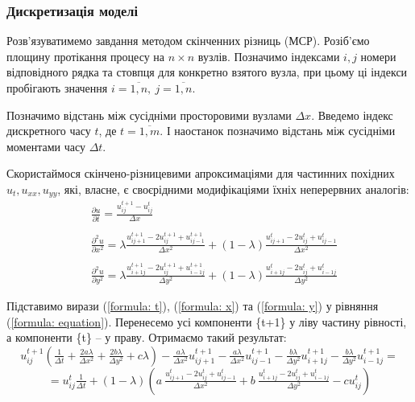 \documentclass[a4paper,14pt]{extarticle} %
\begin{document}
\subsubsection*{Дискретизація моделі} 

Розв'язуватимемо завдання методом скінченних різниць (МСР). Розіб'ємо площину протікання процесу на $n\times n$ 
вузлів. Позначимо індексами $i,j$ номери відповідного рядка та стовпця для конкретно взятого вузла, при цьому 
ці індекси пробігають значення $i=\overline{1,n},\ j=\overline{1,n}$.

Позначимо відстань між сусідніми просторовими вузлами $\Delta x$. Введемо індекс дискретного часу $t$, 
де $t=\overline{1,m}$. І наостанок позначимо відстань між сусідніми моментами часу $\Delta t$.

Скористаймося скінчено-різницевими апроксимаціями для частинних похідних $u_t,u_{xx},u_{yy}$, які, власне, 
є своєрідними модифікаціями їхніх неперервних аналогів:
\begin{align}
    &\frac{\partial u}{\partial t}=\frac{u_{ij}^{t+1} - u_{ij}^{t}}{\Delta x} \label{formula: t} \\ \nonumber \\
    &\frac{\partial^2 u}{\partial x^2}=\lambda\frac{u_{ij+1}^{t+1}-2u_{ij}^{t+1}+u_{ij-1}^{t+1}}{\Delta x^2} 
    + (1-\lambda)\frac{u_{ij+1}^{t}-2u_{ij}^{t}+u_{ij-1}^{t}}{\Delta x^2} \label{formula: x} \\ \nonumber \\
    &\frac{\partial^2 u}{\partial y^2}=\lambda\frac{u_{i+1j}^{t+1}-2u_{ij}^{t+1}+u_{i-1j}^{t+1}}{\Delta y^2} 
    + (1-\lambda)\frac{u_{i+1j}^{t}-2u_{ij}^{t}+u_{i-1j}^{t}}{\Delta y^2} \label{formula: y}
\end{align}

\newpage
Підставимо вирази (\ref{formula: t}), (\ref{formula: x}) та (\ref{formula: y}) у рівняння (\ref{formula: equation}). 
Перенесемо усі компоненти \{t+1\} у ліву частину рівності, а компоненти \{t\} -- у праву. Отримаємо такий 
результат:
\[  u_{ij}^{t+1}(\tfrac{1}{\Delta t}+\tfrac{2a\lambda}{\Delta x^2}+\tfrac{2b\lambda}{\Delta y^2}+c\lambda) - 
    \tfrac{a\lambda}{\Delta x^2}u_{ij+1}^{t+1}-\tfrac{a\lambda}{\Delta x^2}u_{ij-1}^{t+1} - 
    \tfrac{b\lambda}{\Delta y^2}u_{i+1j}^{t+1}-\tfrac{b\lambda}{\Delta y^2}u_{i-1j}^{t+1} = \]
\[  =u_{ij}^t\tfrac{1}{\Delta t} + (1-\lambda)\left(a\ \tfrac{u_{ij+1}^{t}-2u_{ij}^{t}+u_{ij-1}^{t}}{\Delta x^2} + 
    b\ \tfrac{u_{i+1j}^{t}-2u_{ij}^{t}+u_{i-1j}^{t}}{\Delta y^2} - cu_{ij}^t\right) \]
\end{document}

